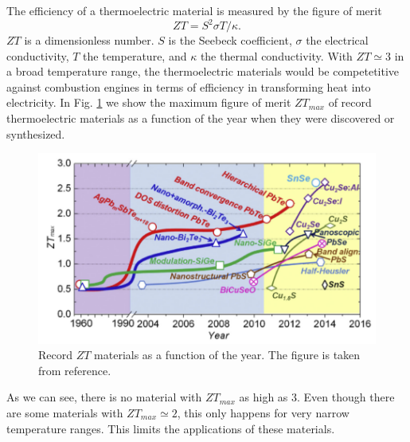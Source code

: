 The efficiency of a thermoelectric material is measured by the figure of merit
\begin{equation}
\label{figureofmerit}
ZT=S^{2}\sigma T/\kappa. 
\end{equation}
$ZT$ is a dimensionless number. $S$ is the Seebeck coefficient, $\sigma$ the electrical conductivity, $T$ the 
temperature, and $\kappa$ the thermal conductivity. With $ZT\simeq3$ in a broad temperature range, the thermoelectric 
materials would be competetitive against combustion engines in terms of efficiency in transforming heat into 
electricity\cite{zhang2015thermoelectric}. In Fig. \ref{ztvst} we show the maximum figure of merit $ZT_{max}$ of 
record thermoelectric materials as a function of the year when they were discovered or synthesized.
\begin{figure}[h]
\begin{center}
\includegraphics[width=0.9\linewidth]{Figures/ztvstemp.png}
\caption[Record $ZT$ materials]{Record $ZT$ materials as a function of the year. The figure is taken from 
reference\cite{zhang2015thermoelectric}.}
\label{ztvst}
\end{center}
\end{figure}
As we can see, there is no material with $ZT_{max}$ as high as 3. Even though there are some materials with  
$ZT_{max}\simeq2$, this only happens for very narrow temperature ranges\cite{zhao2014ultralow}. This 
limits the applications of these materials. \\

